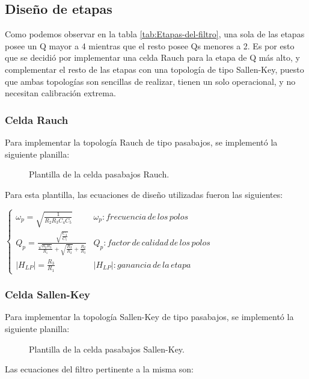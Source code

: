 \documentclass[../../ASSD_TP1_G7.tex]{subfiles}
\begin{document}
\subsection{Diseño de etapas}

Como podemos observar en la tabla \ref{tab:Etapas-del-filtro}, una
sola de las etapas posee un Q mayor a 4 mientras que el resto posee
Qs menores a 2. Es por esto que se decidió por implementar una celda
Rauch para la etapa de Q más alto, y complementar el resto de las
etapas con una topología de tipo Sallen-Key, puesto que ambas topologías
son sencillas de realizar, tienen un solo operacional, y no necesitan
calibración extrema.

\subsubsection{Celda Rauch}

Para implementar la topología Rauch de tipo pasabajos, se implementó
la siguiente planilla:

\begin{figure}[H]
\caption{Plantilla de la celda pasabajos Rauch.}

\end{figure}

Para esta plantilla, las ecuaciones de diseño utilizadas fueron las
siguientes:

$\begin{cases}
\omega_{p}=\sqrt{\frac{1}{R_{2}R_{3}C_{4}C_{5}}} & \omega_{p}:frecuencia\,de\,los\,polos\\
Q_{p}=\frac{\sqrt{\frac{C_{4}}{C_{5}}}}{\frac{\sqrt{R_{2}R_{3}}}{R_{1}}+\sqrt{\frac{R_{3}}{R_{2}}}+\frac{R_{2}}{R_{3}}} & Q_{p}:factor\,de\,calidad\,de\,los\,polos\\
|H_{LP}|=\frac{R_{3}}{R_{1}} & |H_{LP}|:ganancia\,de\,la\,etapa
\end{cases}$

\subsubsection{Celda Sallen-Key}

Para implementar la topología Sallen-Key de tipo pasabajos, se implementó
la siguiente planilla:

\begin{figure}[H]
\caption{Plantilla de la celda pasabajos Sallen-Key.}
\end{figure}

Las ecuaciones del filtro pertinente a la misma son:
\end{document}
